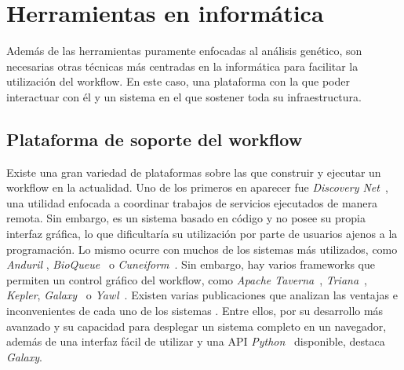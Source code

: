 \section{Herramientas en informática}
Además de las herramientas puramente enfocadas al análisis genético, son necesarias otras técnicas más centradas en la informática para facilitar la utilización del workflow. En este caso, una plataforma con la que poder interactuar con él y un sistema en el que sostener toda su infraestructura.
\subsection{Plataforma de soporte del workflow}
Existe una gran variedad de plataformas sobre las que construir y ejecutar un workflow en la actualidad. Uno de los primeros en aparecer fue \textit{Discovery Net}~\cite{Curcin:2002:DNT:775047.775145}, una utilidad enfocada a coordinar trabajos de servicios ejecutados de manera remota. Sin embargo, es un sistema basado en código y no posee su propia interfaz gráfica, lo que dificultaría su utilización por parte de usuarios ajenos a la programación. Lo mismo ocurre con muchos de los sistemas más utilizados, como \textit{Anduril} \cite{Ovaska2010}, \textit{BioQueue}~ \cite{10.1093/bioinformatics/btx403} o \textit{Cuneiform}~\cite{brandt_reisig_leser_2017}. Sin embargo, hay varios frameworks que permiten un control gráfico del workflow, como \textit{Apache Taverna}~\cite{10.1093/nar/gkt328}, \textit{Triana}~\cite{Taylor2007}, \textit{Kepler}\cite{Ludascher:2006:SWM:1148437.1148454}, \textit{Galaxy}~\cite{Galaxy} o \textit{Yawl}~\cite{yawl2004}. Existen varias publicaciones que analizan las ventajas e inconvenientes de cada uno de los sistemas \cite{4786077, Abouelhoda:2010:MPI:1833398.1833400, Nyronen:2012:DII:2361999.2362006, 10.1093/bib/bbw020}. Entre ellos, por su desarrollo más avanzado y su capacidad para desplegar un sistema completo en un navegador, además de una interfaz fácil de utilizar y una API \textit{Python}~\cite{GalaxyAPI} disponible, destaca \textit{Galaxy}.

